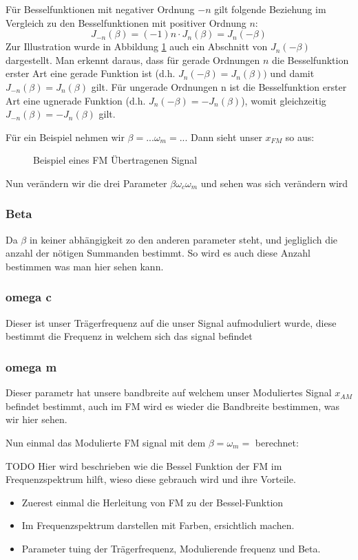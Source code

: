 Für Besselfunktionen mit negativer Ordnung \(-n\) gilt folgende Beziehung im Vergleich zu den Besselfunktionen mit positiver Ordnung \(n\):
\[
    J_{-n} (\beta) = (-1) n \cdot J_n (\beta) = J_n (-\beta)
    \label{fm:eq:besselid:gerad:ungerade}
\]
Zur Illustration wurde in Abbildung \ref{fig:bessel} auch ein Abschnitt von \(J_n (-\beta)\) dargestellt.
Man erkennt daraus, dass für gerade Ordnungen \(n\) die Besselfunktion erster Art eine gerade Funktion ist 
(d.h. \(J_n (-\beta) = J_n (\beta))\) und damit \(J_{-n} (\beta) = J_n (\beta)\) gilt.
Für ungerade Ordnungen n ist die Besselfunktion erster Art eine ugnerade Funktion 
(d.h. \(J_n (-\beta) = -J_n (\beta)\)), womit gleichzeitig \(J_{-n} (\beta) = -J_n (\beta)\) gilt.

Für ein Beispiel nehmen wir  \(\beta = ... \omega_m = ... \)
Dann sieht unser \(x_{FM}\) so aus:
\begin{figure}
	\centering
	
	\caption{Beispiel eines FM Übertragenen Signal}
	\label{fig:bessel}
\end{figure}
Nun verändern wir die drei Parameter \(\beta \omega_c \omega_m \) und sehen was sich verändern wird

\subsubsection{Beta}
Da \(\beta\) in keiner abhängigkeit zo den anderen parameter steht, und jegliglich die anzahl der nötigen Summanden bestimmt.
So wird es auch diese Anzahl bestimmen was man hier sehen kann.

\subsubsection{omega c}
Dieser ist unser Trägerfrequenz auf die unser Signal aufmoduliert wurde, diese bestimmt die Frequenz in welchem sich das signal befindet

\subsubsection{omega m}
Dieser parametr hat unsere bandbreite auf welchem unser Moduliertes Signal \(x_{AM}\) befindet bestimmt, auch im FM wird es wieder die Bandbreite bestimmen, was wir hier sehen.

Nun einmal das Modulierte FM signal mit dem \(\beta =  \omega_m =  \) berechnet:



TODO
Hier wird beschrieben wie die Bessel Funktion der FM im Frequenzspektrum hilft, wieso diese gebrauch wird und ihre Vorteile.
\begin{itemize}
    \item Zuerest einmal die Herleitung von FM zu der Bessel-Funktion
    \item Im Frequenzspektrum darstellen mit Farben, ersichtlich machen. 
    \item Parameter tuing der Trägerfrequenz, Modulierende frequenz und Beta. 
\end{itemize}
\newpage





